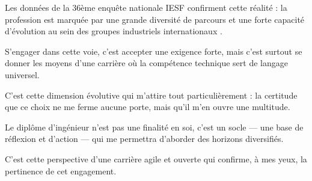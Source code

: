 Les données de la 36ème enquête nationale IESF confirment cette réalité : 
la profession est marquée par une grande diversité de parcours 
et une forte capacité d'évolution au sein des groupes industriels internationaux \cite{iesf_tendances_2025}. 

S'engager dans cette voie, c'est accepter une exigence forte, 
mais c'est surtout se donner les moyens d'une carrière où la compétence technique 
sert de langage universel. 

C'est cette dimension évolutive qui m'attire tout particulièrement : 
la certitude que ce choix ne me ferme aucune porte, 
mais qu'il m'en ouvre une multitude. 

Le diplôme d'ingénieur n'est pas une finalité en soi, 
c'est un socle — une base de réflexion et d'action — 
qui me permettra d'aborder des horizons diversifiés. 

C'est cette perspective d'une carrière agile et ouverte 
qui confirme, à mes yeux, la pertinence de cet engagement.